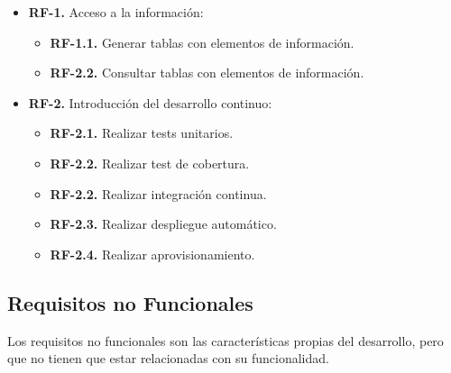 \begin{itemize}
  \item \textbf{RF-1.} Acceso a la información:
    \begin{itemize}
    \item \textbf{RF-1.1.} Generar tablas con elementos de información.
    \item \textbf{RF-2.2.} Consultar tablas con elementos de información.
    \end{itemize}
\end{itemize}

\begin{itemize}
  \item \textbf{RF-2.} Introducción del desarrollo continuo:
  \begin{itemize}
    \item \textbf{RF-2.1.} Realizar tests unitarios.
    \item \textbf{RF-2.2.} Realizar test de cobertura.
    \item \textbf{RF-2.2.} Realizar integración continua.
    \item \textbf{RF-2.3.} Realizar despliegue automático.
    \item \textbf{RF-2.4.} Realizar aprovisionamiento.
    \end{itemize}
\end{itemize}

\subsection{Requisitos no Funcionales}

Los requisitos no funcionales son las características propias del desarrollo, pero que no tienen que estar relacionadas con su 
funcionalidad.

